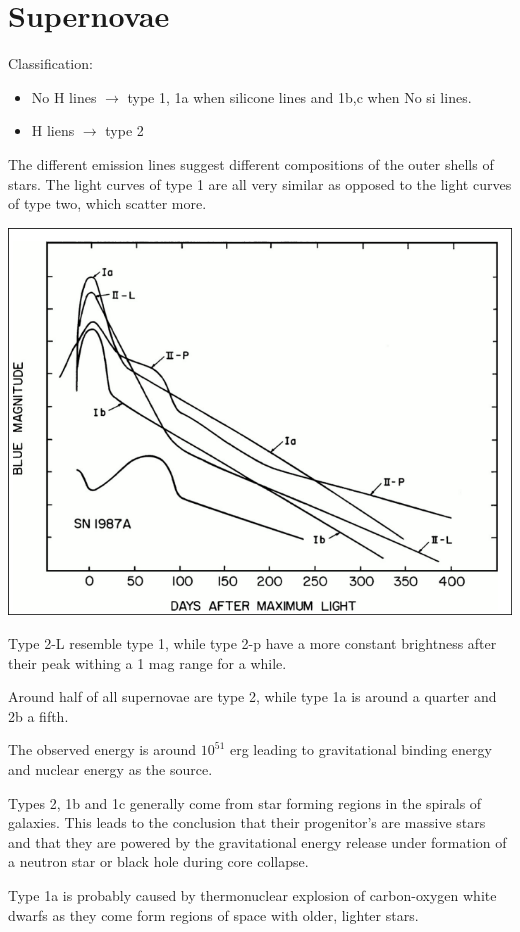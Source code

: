\documentclass[11pt,a4paper]{article}
\begin{document}
\section{Supernovae}
Classification:
\begin{itemize}
    \item No H lines $\rightarrow$ type 1, 1a when silicone lines and  1b,c when No si lines. 
    \item H liens $\rightarrow$ type 2
\end{itemize}
The different emission lines suggest different compositions of the outer shells of stars. 
The light curves of type 1 are all very similar as opposed to the light curves of type two, which scatter more. 
\begin{center}
    \includegraphics[width=0.5\linewidth]{screenshot_2024-01-24-104355.png}
\end{center}
Type 2-L resemble type 1, while type 2-p have a more constant brightness after their peak withing a 1 mag range for a while.

Around half of all supernovae are type 2, while type 1a is around a quarter and 2b a fifth.

The observed energy is around $10^{51}$ erg leading to gravitational binding energy and nuclear energy as the source. 

Types 2, 1b and 1c generally come from star forming regions in the spirals of galaxies.
This leads to the conclusion that their progenitor's are massive stars and that they are powered by the gravitational energy release under formation of a neutron star or black hole during core collapse. 

Type 1a is probably caused by thermonuclear explosion of carbon-oxygen white dwarfs as they come form regions of space with older, lighter stars. 
\end{document}
